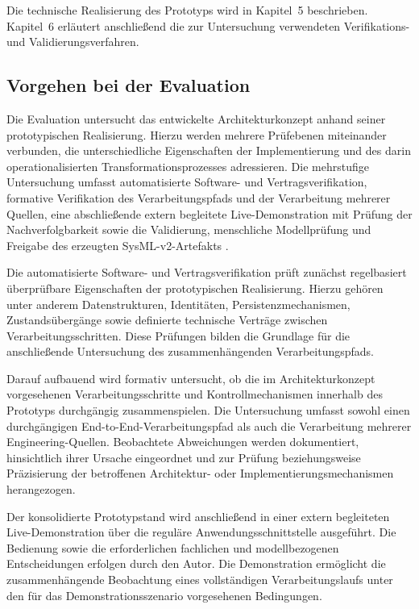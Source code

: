 Die technische Realisierung des Prototyps wird in Kapitel~5 beschrieben.
Kapitel~6 erläutert anschließend die zur Untersuchung verwendeten
Verifikations- und Validierungsverfahren.

\subsection{Vorgehen bei der Evaluation}
\label{sec:evaluationslogik}

Die Evaluation untersucht das entwickelte Architekturkonzept anhand seiner
prototypischen Realisierung. Hierzu werden mehrere Prüfebenen miteinander
verbunden, die unterschiedliche Eigenschaften der Implementierung und des
darin operationalisierten Transformationsprozesses adressieren. Die
mehrstufige Untersuchung umfasst automatisierte Software- und
Vertragsverifikation, formative Verifikation des Verarbeitungspfads und der
Verarbeitung mehrerer Quellen, eine abschließende extern begleitete
Live-Demonstration mit Prüfung der Nachverfolgbarkeit sowie die Validierung,
menschliche Modellprüfung und Freigabe des erzeugten
SysML-v2-Artefakts \cite{Wieringa2014,ISO42030}.

Die automatisierte Software- und Vertragsverifikation prüft zunächst
regelbasiert überprüfbare Eigenschaften der prototypischen Realisierung.
Hierzu gehören unter anderem Datenstrukturen, Identitäten,
Persistenzmechanismen, Zustandsübergänge sowie definierte technische
Verträge zwischen Verarbeitungsschritten. Diese Prüfungen bilden die
Grundlage für die anschließende Untersuchung des zusammenhängenden
Verarbeitungspfads.

Darauf aufbauend wird formativ untersucht, ob die im Architekturkonzept
vorgesehenen Verarbeitungsschritte und Kontrollmechanismen innerhalb des
Prototyps durchgängig zusammenspielen. Die Untersuchung umfasst sowohl einen
durchgängigen End-to-End-Verarbeitungspfad als auch die Verarbeitung mehrerer
Engineering-Quellen. Beobachtete Abweichungen werden dokumentiert,
hinsichtlich ihrer Ursache eingeordnet und zur Prüfung beziehungsweise
Präzisierung der betroffenen Architektur- oder Implementierungsmechanismen
herangezogen.

Der konsolidierte Prototypstand wird anschließend in einer extern begleiteten
Live-Demonstration über die reguläre Anwendungsschnittstelle ausgeführt. Die
Bedienung sowie die erforderlichen fachlichen und modellbezogenen
Entscheidungen erfolgen durch den Autor. Die Demonstration ermöglicht die
zusammenhängende Beobachtung eines vollständigen Verarbeitungslaufs unter den
für das Demonstrationsszenario vorgesehenen Bedingungen.

